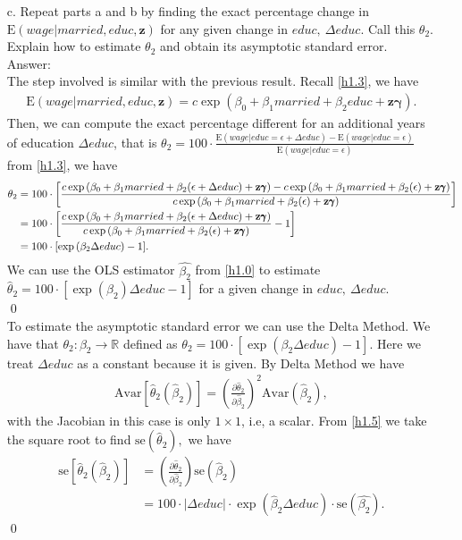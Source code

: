 \documentclass[10pt]{article}
\newcommand{\E}{\text{E}}
\newcommand{\Av}{\text{Avar}}
\newcommand{\se}{\text{se}}
\begin{document}
\begin{enumerate}
\item[c.] Repeat parts a and b by finding the exact percentage change in $\E(wage|married,educ,\mathbf{z})$ for any given change in $educ,\ \Delta educ.$ Call this $\theta_2.$ Explain how to estimate $\theta_2$ and obtain its asymptotic standard error.
\\ Answer:\\
The step involved is similar with the previous result. Recall \eqref{h1.3}, we have
\begin{align*}
    \E(wage|married,educ,\mathbf{z})=c\exp{(\beta_0+\beta_1 married +\beta_2 educ+\mathbf{z}\pmb{\gamma})}.
\end{align*}
Then, we can compute the exact percentage different for an additional years of education $\Delta educ$, that is $\theta_2=100\cdot\frac{\E(wage|educ=\epsilon+\Delta educ)-\E(wage|educ=\epsilon)}{\E(wage|educ=\epsilon)}$ from \eqref{h1.3}, we have
\begin{align}
    \theta_2&=100\cdot\left[\frac{c\exp{(\beta_0+\beta_1 married +\beta_2 (\epsilon+ \Delta educ)+\mathbf{z}\pmb{\gamma})}-c\exp{(\beta_0+\beta_1 married +\beta_2 (\epsilon)+\mathbf{z}\pmb{\gamma})}}{c\exp{(\beta_0+\beta_1 married +\beta_2 (\epsilon)+\mathbf{z}\pmb{\gamma})}}\right] \notag \\
    &=100\cdot\left[\frac{c\exp{(\beta_0+\beta_1 married +\beta_2 (\epsilon+ \Delta educ)+\mathbf{z}\pmb{\gamma})}}{c\exp{(\beta_0+\beta_1 married +\beta_2 (\epsilon)+\mathbf{z}\pmb{\gamma})}}-1\right] \notag \\
    &=100\cdot[\exp{(\beta_2\Delta educ)}-1]. \notag
\end{align} 
We can use the OLS estimator $\hat{\beta_2}$ from \eqref{h1.0} to estimate $\hat{\theta}_2=100\cdot[\exp{(\beta_2)}\Delta educ-1]$ for a given change in $educ,\ \Delta educ.$ 
\\ \qed \\
To estimate the asymptotic standard error we can use the Delta Method. We have that $\theta_2:\beta_2\to\mathbb{R}$ defined as $\theta_2=100\cdot[\exp{(\beta_2\Delta educ)} -1].$ Here we treat $\Delta educ$ as a constant because it is given. By Delta Method we have
\begin{align}
    \Av[\hat{\theta}_2(\hat{\beta}_2)]=\left(\frac{\partial\hat{\theta}_2}{\partial \hat{\beta}_2} \right)^2 \Av(\hat{\beta}_2), \label{h1.5}
\end{align}
with the Jacobian in this case is only $1\times 1$, i.e, a scalar. From \eqref{h1.5} we take the square root to find $\se(\hat{\theta}_2),$ we have
\begin{align*}
    \se[\hat{\theta}_2(\hat{\beta}_2)]&=\left(\frac{\partial\hat{\theta}_2}{\partial \hat{\beta}_2} \right) \se(\hat{\beta}_2) \\
    &=100\cdot |\Delta educ| \cdot\exp(\hat{\beta}_2 \Delta educ)\cdot \se(\hat{\beta_2}).
\end{align*}\qed



\end{enumerate}
\end{document}
